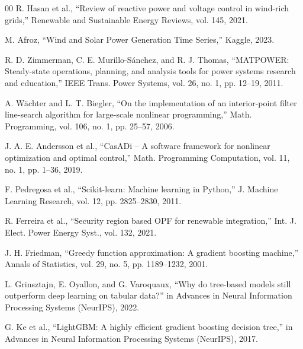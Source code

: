 \documentclass[conference]{IEEEtran}
\begin{document}
\begin{thebibliography}{00}
 R. Hasan et al., ``Review of reactive power and voltage control in wind-rich grids,'' Renewable and Sustainable Energy Reviews, vol. 145, 2021.

 M. Afroz, ``Wind and Solar Power Generation Time Series,'' Kaggle, 2023.

 R. D. Zimmerman, C. E. Murillo-Sánchez, and R. J. Thomas, ``MATPOWER: Steady-state operations, planning, and analysis tools for power systems research and education,'' IEEE Trans. Power Systems, vol. 26, no. 1, pp. 12--19, 2011.

 A. Wächter and L. T. Biegler, ``On the implementation of an interior-point filter line-search algorithm for large-scale nonlinear programming,'' Math. Programming, vol. 106, no. 1, pp. 25--57, 2006.

 J. A. E. Andersson et al., ``CasADi -- A software framework for nonlinear optimization and optimal control,'' Math. Programming Computation, vol. 11, no. 1, pp. 1--36, 2019.

 F. Pedregosa et al., ``Scikit-learn: Machine learning in Python,'' J. Machine Learning Research, vol. 12, pp. 2825--2830, 2011.

 R. Ferreira et al., ``Security region based OPF for renewable integration,'' Int. J. Elect. Power Energy Syst., vol. 132, 2021.

 J. H. Friedman, ``Greedy function approximation: A gradient boosting machine,'' Annals of Statistics, vol. 29, no. 5, pp. 1189--1232, 2001.

 L. Grinsztajn, E. Oyallon, and G. Varoquaux, ``Why do tree-based models still outperform deep learning on tabular data?'' in Advances in Neural Information Processing Systems (NeurIPS), 2022.

 G. Ke et al., ``LightGBM: A highly efficient gradient boosting decision tree,'' in Advances in Neural Information Processing Systems (NeurIPS), 2017.

\end{thebibliography}

\end{document}
